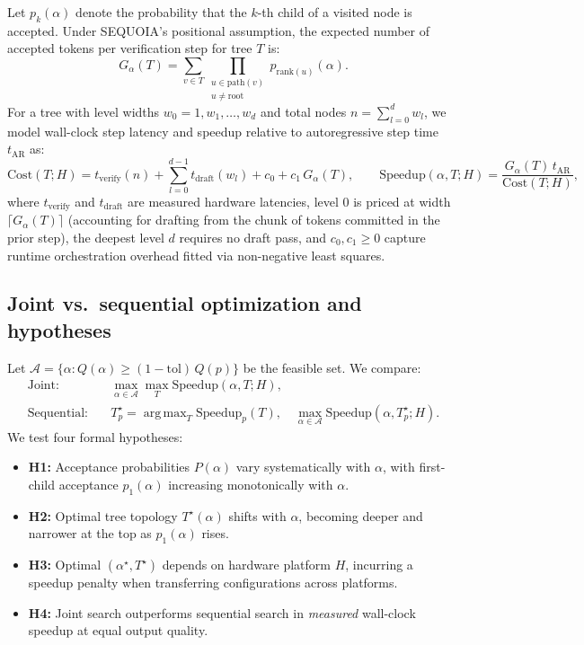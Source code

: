 \documentclass[10pt]{article}
\DeclareMathOperator*{\argmax}{arg\,max}
\begin{document}
Let $p_k(\alpha)$ denote the probability that the $k$-th child of a visited node is accepted. Under SEQUOIA's positional assumption, the expected number of accepted tokens per verification step for tree $T$ is:
\begin{equation}
  G_\alpha(T) = \sum_{v \in T} \prod_{\substack{u \in \mathrm{path}(v) \\ u \neq \mathrm{root}}} p_{\mathrm{rank}(u)}(\alpha).
\end{equation}
For a tree with level widths $w_0 = 1, w_1, \dots, w_d$ and total nodes $n = \sum_{l=0}^d w_l$, we model wall-clock step latency and speedup relative to autoregressive step time $t_{\mathrm{AR}}$ as:
\begin{equation}
  \mathrm{Cost}(T; H) = t_{\mathrm{verify}}(n) + \sum_{l=0}^{d-1} t_{\mathrm{draft}}(w_l) + c_0 + c_1\, G_\alpha(T), \qquad
  \mathrm{Speedup}(\alpha, T; H) = \frac{G_\alpha(T)\, t_{\mathrm{AR}}}{\mathrm{Cost}(T; H)},
  \label{eq:cost}
\end{equation}
where $t_{\mathrm{verify}}$ and $t_{\mathrm{draft}}$ are measured hardware latencies, level $0$ is priced at width $\lceil G_\alpha(T) \rceil$ (accounting for drafting from the chunk of tokens committed in the prior step), the deepest level $d$ requires no draft pass, and $c_0, c_1 \ge 0$ capture runtime orchestration overhead fitted via non-negative least squares.

\subsection{Joint vs.\ sequential optimization and hypotheses}
Let $\mathcal{A} = \{\alpha : Q(\alpha) \ge (1 - \mathrm{tol})\, Q(p)\}$ be the feasible set. We compare:
\begin{align}
  \text{Joint:} &\quad \max_{\alpha \in \mathcal{A}} \max_{T} \mathrm{Speedup}(\alpha, T; H), \\
  \text{Sequential:} &\quad T_p^\star = \argmax_{T} \mathrm{Speedup}_p(T), \quad \max_{\alpha \in \mathcal{A}} \mathrm{Speedup}(\alpha, T_p^\star; H).
\end{align}
We test four formal hypotheses:
\begin{itemize}
    \item \textbf{H1:} Acceptance probabilities $P(\alpha)$ vary systematically with $\alpha$, with first-child acceptance $p_1(\alpha)$ increasing monotonically with $\alpha$.
    \item \textbf{H2:} Optimal tree topology $T^\star(\alpha)$ shifts with $\alpha$, becoming deeper and narrower at the top as $p_1(\alpha)$ rises.
    \item \textbf{H3:} Optimal $(\alpha^\star, T^\star)$ depends on hardware platform $H$, incurring a speedup penalty when transferring configurations across platforms.
    \item \textbf{H4:} Joint search outperforms sequential search in \emph{measured} wall-clock speedup at equal output quality.
\end{itemize}
\end{document}
